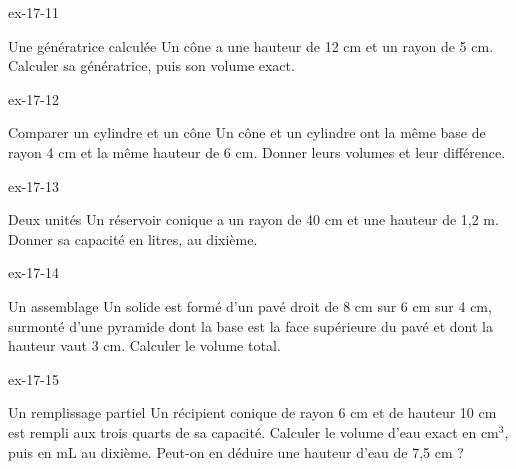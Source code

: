 \begin{blocLivre}{ex-17-11}\begin{exercice}[3]{Une génératrice calculée}
Un cône a une hauteur de 12 cm et un rayon de 5 cm. Calculer sa génératrice, puis son volume exact.
\label{fig-ex-17-11}
\end{exercice}\end{blocLivre}
\begin{blocLivre}{ex-17-12}\begin{exercice}[3]{Comparer un cylindre et un cône}
Un cône et un cylindre ont la même base de rayon 4 cm et la même hauteur de 6 cm. Donner leurs volumes et leur différence.
\label{fig-ex-17-12}
\end{exercice}\end{blocLivre}
\begin{blocLivre}{ex-17-13}\begin{exercice}[3]{Deux unités}
Un réservoir conique a un rayon de 40 cm et une hauteur de 1,2 m. Donner sa capacité en litres, au dixième.
\label{fig-ex-17-13}
\end{exercice}\end{blocLivre}
\begin{blocLivre}{ex-17-14}\begin{exercice}[3]{Un assemblage}
Un solide est formé d’un pavé droit de 8 cm sur 6 cm sur 4 cm, surmonté d’une pyramide dont la base est la face supérieure du pavé et dont la hauteur vaut 3 cm. Calculer le volume total.
\label{fig-ex-17-14}
\end{exercice}\end{blocLivre}
\begin{blocLivre}{ex-17-15}\begin{exercice}[3]{Un remplissage partiel}
Un récipient conique de rayon 6 cm et de hauteur 10 cm est rempli aux trois quarts de sa capacité. Calculer le volume d’eau exact en cm$^3$, puis en mL au dixième. Peut-on en déduire une hauteur d’eau de 7,5 cm ?
\label{fig-ex-17-15}
\end{exercice}\end{blocLivre}

\clearpage
